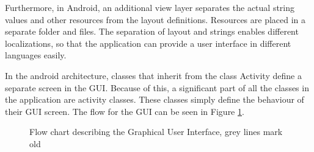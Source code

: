 Furthermore, in Android, an additional view layer separates the actual string values and other resources from the layout definitions. Resources are placed in a separate folder and files. The separation of layout and strings enables different localizations, so that the application can provide a user interface in different languages easily. 

In the android architecture, classes that inherit from the class Activity define a separate screen in the GUI. Because of this, a significant part of all the classes in the application are activity classes. These classes simply define the behaviour of their GUI screen. The flow for the GUI can be seen in Figure \ref{fig:GUIFlowchart}.



\begin{figure}
\setlength\fboxsep{0pt}
\setlength\fboxrule{1pt}\noindent{}
\caption{Flow chart describing the Graphical User Interface, grey lines mark old}
\label{fig:GUIFlowchart}
\end{figure}

\pagebreak

